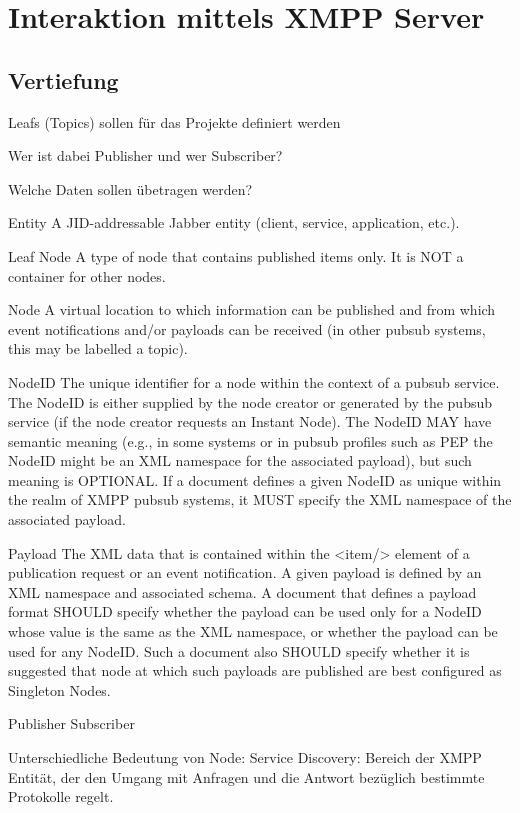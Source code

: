 
\section{Interaktion mittels XMPP Server}

\subsection{Vertiefung}


Leafs (Topics) sollen für das Projekte definiert werden

Wer ist dabei Publisher und wer Subscriber?

Welche Daten sollen übetragen werden?

Entity
A JID-addressable Jabber entity (client, service, application, etc.).

Leaf Node
A type of node that contains published items only. It is NOT a container for other nodes.

Node
A virtual location to which information can be published and from which event notifications and/or payloads can be received (in other pubsub systems, this may be labelled a topic).

NodeID
The unique identifier for a node within the context of a pubsub service. The NodeID is either supplied by the node creator or generated by the pubsub service (if the node creator requests an Instant Node). The NodeID MAY have semantic meaning (e.g., in some systems or in pubsub profiles such as PEP the NodeID might be an XML namespace for the associated payload), but such meaning is OPTIONAL. If a document defines a given NodeID as unique within the realm of XMPP pubsub systems, it MUST specify the XML namespace of the associated payload.

Payload
The XML data that is contained within the <item/> element of a publication request or an event notification. A given payload is defined by an XML namespace and associated schema. A document that defines a payload format SHOULD specify whether the payload can be used only for a NodeID whose value is the same as the XML namespace, or whether the payload can be used for any NodeID. Such a document also SHOULD specify whether it is suggested that node at which such payloads are published are best configured as Singleton Nodes.

Publisher
Subscriber

Unterschiedliche Bedeutung von Node:
Service Discovery: Bereich der XMPP Entität, der den Umgang mit Anfragen und die Antwort bezüglich bestimmte Protokolle regelt.

